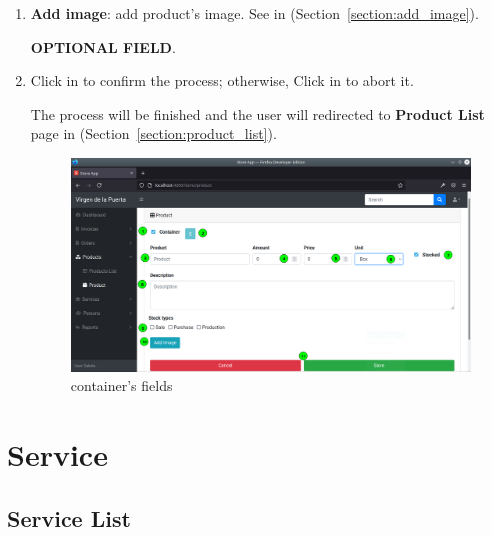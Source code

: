 \documentclass[a4paper,11pt]{refart}
\begin{document}
\begin{enumerate}
	\item \textbf{Add image}: add product's image. See in (Section~\ref{section:add_image}).
		\medskip
		\begin{leftbar}
			\textbf{OPTIONAL FIELD}.
		\end{leftbar}  
	\item Click in  to confirm the process; otherwise, Click in  to abort it.
		\medskip
		\begin{leftbar}
			The process will be finished and the user will redirected to \textbf{Product List} page in (Section~\ref{section:product_list}).
		\end{leftbar}
	\begin{figure}[H]\centering
	\includegraphics[width=\textwidth]{images/product_form-fields-container.png}
	\caption{container's fields}
	\label{fig:product_form-fields-container}
\end{figure}
\end{enumerate}	



\section{Service}
\subsection{Service List}\label{section:service_list}
\end{document}
